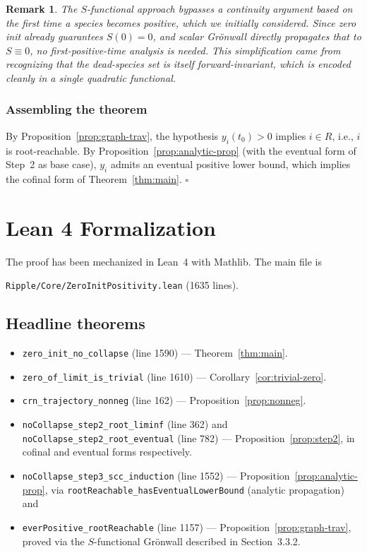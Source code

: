 \documentclass[11pt]{article}
\newtheorem{remark}[theorem]{Remark}
\begin{document}
\begin{remark}
The $S$-functional approach bypasses a continuity argument based on the
first time a species becomes positive, which we initially considered. Since
zero init already guarantees $S(0) = 0$, and scalar Gr\"onwall directly
propagates that to $S \equiv 0$, no first-positive-time analysis is needed.
This simplification came from recognizing that the dead-species set is
itself forward-invariant, which is encoded cleanly in a single quadratic
functional.
\end{remark}

\subsubsection{Assembling the theorem}

By Proposition~\ref{prop:graph-trav}, the hypothesis $y_i(t_0) > 0$ implies
$i \in R$, i.e., $i$ is root-reachable. By Proposition~\ref{prop:analytic-prop}
(with the eventual form of Step~2 as base case), $y_i$ admits an eventual
positive lower bound, which implies the cofinal form of
Theorem~\ref{thm:main}. \hfill$\square$

\section{Lean 4 Formalization}

The proof has been mechanized in Lean~4 with Mathlib. The main file is
\begin{center}
\texttt{Ripple/Core/ZeroInitPositivity.lean} (1635 lines).
\end{center}

\subsection*{Headline theorems}

\begin{itemize}
  \item \texttt{zero\_init\_no\_collapse} (line 1590) --- Theorem~\ref{thm:main}.
  \item \texttt{zero\_of\_limit\_is\_trivial} (line 1610) --- Corollary~\ref{cor:trivial-zero}.
  \item \texttt{crn\_trajectory\_nonneg} (line 162) --- Proposition~\ref{prop:nonneg}.
  \item \texttt{noCollapse\_step2\_root\_liminf} (line 362) and
        \texttt{noCollapse\_step2\_root\_eventual} (line 782) --- Proposition~\ref{prop:step2}, in cofinal and eventual forms respectively.
  \item \texttt{noCollapse\_step3\_scc\_induction} (line 1552) ---
        Proposition~\ref{prop:analytic-prop}, via
        \texttt{rootReachable\_hasEventualLowerBound} (analytic propagation) and
  \item \texttt{everPositive\_rootReachable} (line 1157) ---
        Proposition~\ref{prop:graph-trav}, proved via the
        \mbox{$S$-functional} Gr\"onwall described in Section~3.3.2.
\end{itemize}
\end{document}

